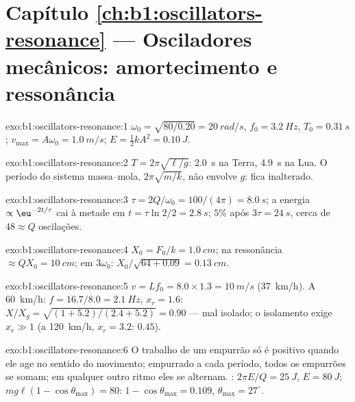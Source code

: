 \section*{Capítulo \ref{ch:b1:oscillators-resonance} --- Osciladores mecânicos: amortecimento e ressonância}

\begin{solution}{exo:b1:oscillators-resonance:1}
$\omega_0 = \sqrt{80/0.20} = \qty{20}{rad/s}$, $f_0 = \qty{3.2}{Hz}$, $T_0 =
\qty{0.31}{s}$; $v_{\max} = A\omega_0 = \qty{1.0}{m/s}$; $E = \tfrac12 kA^2 =
\qty{0.10}{J}$.
\end{solution}

\begin{solution}{exo:b1:oscillators-resonance:2}
$T = 2\pi\sqrt{\ell/g}$: \qty{2.0}{s} na Terra, \qty{4.9}{s} na Lua.
O período do sistema massa--mola, $2\pi\sqrt{m/k}$, não envolve $g$:
fica inalterado.
\end{solution}

\begin{solution}{exo:b1:oscillators-resonance:3}
$\tau = 2Q/\omega_0 = 100/(4\pi) = \qty{8.0}{s}$; a energia $\propto \eu^{-2t/\tau}$
cai à metade em $t = \tau\ln2/2 = \qty{2.8}{s}$; $5\%$ após $3\tau = \qty{24}{s}$,
cerca de $48 \approx Q$ oscilações.
\end{solution}

\begin{solution}{exo:b1:oscillators-resonance:4}
$X_0 = F_0/k = \qty{1.0}{cm}$; na ressonância $\approx QX_0 = \qty{10}{cm}$;
em $3\omega_0$: $X_0/\sqrt{64 + 0.09} = \qty{0.13}{cm}$.
\end{solution}

\begin{solution}{exo:b1:oscillators-resonance:5}
$v = Lf_0 = 8.0 \times 1.3 = \qty{10}{m/s}$ (\qty{37}{km/h}). A
\qty{60}{km/h}: $f = 16.7/8.0 = \qty{2.1}{Hz}$, $x_r = 1.6$: $X/X_g =
\sqrt{(1 + 5.2)/(2.4 + 5.2)} = 0.90$ --- mal isolado; o isolamento
exige $x_r \gg 1$ (a \qty{120}{km/h}, $x_r = 3.2$: $0.45$).
\end{solution}

\begin{solution}{exo:b1:oscillators-resonance:6}
O trabalho de um empurrão só é positivo quando ele age no sentido do movimento;
empurrado a cada período, todos os empurrões se somam; em qualquer outro ritmo eles
se alternam. : $2\pi E/Q = \qty{25}{J}$, $E = \qty{80}{J}$;
$mg\ell(1 - \cos\theta_{\max}) = 80$: $1 - \cos\theta_{\max} = 0.109$,
$\theta_{\max} = 27^\circ$.
\end{solution}

